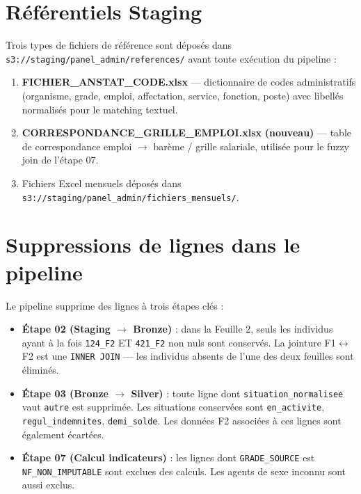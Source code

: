 \documentclass[12pt,a4paper,french]{report}
\newcommand{\bucket}[1]{\texttt{s3://#1}}
\newcommand{\colname}[1]{\texttt{#1}}
\begin{document}
\section{Référentiels Staging}

Trois types de fichiers de référence sont déposés dans
\bucket{staging/panel\_admin/references/} avant toute exécution du pipeline :

\begin{enumerate}
  \item \textbf{FICHIER\_ANSTAT\_CODE.xlsx} — dictionnaire de codes administratifs
        (organisme, grade, emploi, affectation, service, fonction, poste) avec
        libellés normalisés pour le matching textuel.
  \item \textbf{CORRESPONDANCE\_GRILLE\_EMPLOI.xlsx} \textbf{(nouveau)} — table de
        correspondance emploi $\rightarrow$ barème / grille salariale, utilisée pour
        le fuzzy join de l'étape 07.
  \item Fichiers Excel mensuels déposés dans
        \bucket{staging/panel\_admin/fichiers\_mensuels/}.
\end{enumerate}

\section{Suppressions de lignes dans le pipeline}

Le pipeline supprime des lignes à trois étapes clés :

\begin{itemize}
  \item \textbf{Étape 02 (Staging $\rightarrow$ Bronze)} : dans la Feuille 2,
        seuls les individus ayant à la fois \texttt{124\_F2} ET \texttt{421\_F2}
        non nuls sont conservés. La jointure F1$\leftrightarrow$F2 est une
        \texttt{INNER JOIN} --- les individus absents de l'une des deux feuilles
        sont éliminés.
  \item \textbf{Étape 03 (Bronze $\rightarrow$ Silver)} : toute ligne dont
        \colname{situation\_normalisee} vaut \texttt{autre} est supprimée.
        Les situations conservées sont \texttt{en\_activite},
        \texttt{regul\_indemnites}, \texttt{demi\_solde}. Les données F2
        associées à ces lignes sont également écartées.
  \item \textbf{Étape 07 (Calcul indicateurs)} : les lignes dont
        \colname{GRADE\_SOURCE} est \texttt{NF\_NON\_IMPUTABLE} sont exclues
        des calculs. Les agents de sexe inconnu sont aussi exclus.
\end{itemize}
\end{document}
